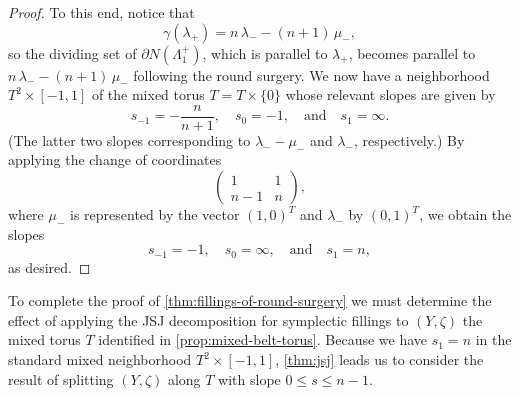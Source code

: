 \documentclass[11pt]{amsart}
\numberwithin{equation}{section}
\theoremstyle{plain}
\theoremstyle{definition}
\theoremstyle{remark}\newtheorem{rem}[equation]{Remark}%
\theoremstyle{remark}\newtheorem{obs}[equation]{Observation}%
\begin{document}
\begin{proof}
To this end, notice that
\[
\gamma(\lambda_+) = n\,\lambda_- - (n+1)\,\mu_-,
\]
so the dividing set of $\partial N(\Lambda_1^+)$, which is parallel to $\lambda_+$, becomes parallel to $n\,\lambda_- - (n+1)\,\mu_-$ following the round surgery.  We now have a neighborhood $T^2\times[-1,1]$ of the mixed torus $T=T\times\{0\}$ whose relevant slopes are given by
\[
s_{-1} = -\dfrac{n}{n+1},
\quad
s_0 = -1,
\quad\text{and}\quad
s_1 = \infty.
\]
(The latter two slopes corresponding to $\lambda_--\mu_-$ and $\lambda_-$, respectively.)  By applying the change of coordinates
\[
\left(\begin{matrix}
    1 & 1\\
    n-1 & n
\end{matrix}\right),
\]
where $\mu_-$ is represented by the vector $(1,0)^T$ and $\lambda_-$ by $(0,1)^T$, we obtain the slopes
\[
s_{-1} = -1,
\quad
s_0 = \infty,
\quad\text{and}\quad
s_1 = n,
\]
as desired.
\end{proof}


To complete the proof of \cref{thm:fillings-of-round-surgery} we must determine the effect of applying the JSJ decomposition for symplectic fillings to $(Y,\zeta)$ the mixed torus $T$ identified in \cref{prop:mixed-belt-torus}.  Because we have $s_1=n$ in the standard mixed neighborhood $T^2\times[-1,1]$, \cref{thm:jsj} leads us to consider the result of splitting $(Y,\zeta)$ along $T$ with slope $0\leq s\leq n-1$. 
\end{document}

